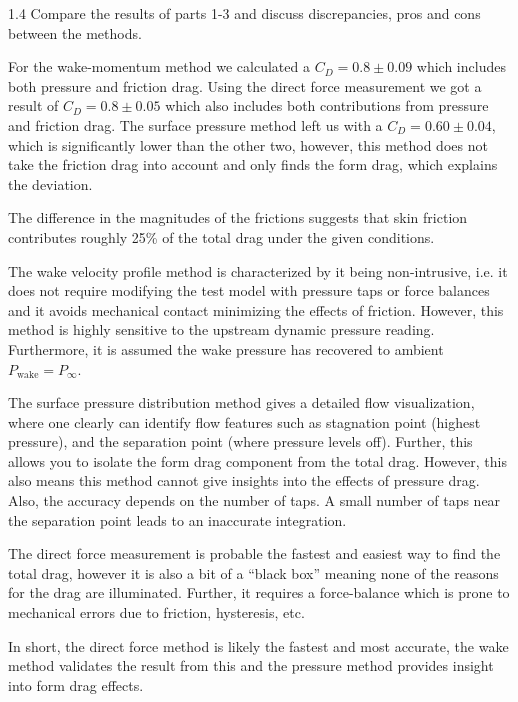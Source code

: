 
  \begin{problem}{1.4}
    Compare the results of parts 1-3 and discuss discrepancies, pros and cons between the methods.
  \end{problem}

  \begin{derivation}
    For the wake-momentum method we calculated a $C_D = \num{0,8}  \pm \num{0,09}$ which includes both pressure and friction drag.
    Using the direct force measurement we got a result of $C_D = \num{0,8} \pm \num{0,05}$ which also includes both contributions from pressure and friction drag.
    The surface pressure method left us with a $C_D = \num{0,60} \pm \num{0,04}$, which is significantly lower than the other two, however, this method does not take the friction drag into account and only finds the form drag, which explains the deviation.

    The difference in the magnitudes of the frictions suggests that skin friction contributes roughly 25\% of the total drag under the given conditions. 

    The wake velocity profile method is characterized by it being non-intrusive, i.e. it does not require modifying the test model with pressure taps or force balances and it avoids mechanical contact minimizing the effects of friction.
    However, this method is highly sensitive to the upstream dynamic pressure reading. Furthermore, it is assumed the wake pressure has recovered to ambient $P_{\text{wake}} = P_{\infty}$. 

    The surface pressure distribution method gives a detailed flow visualization, where one clearly can identify flow features such as stagnation point (highest pressure), and the separation point (where pressure levels off).
    Further, this allows you to isolate the form drag component from the total drag.
    However, this also means this method cannot give insights into the effects of pressure drag.
    Also, the accuracy depends on the number of taps.
    A small number of taps near the separation point leads to an inaccurate integration.

    The direct force measurement is probable the fastest and easiest way to find the total drag, however it is also a bit of a ``black box'' meaning none of the reasons for the drag are illuminated.
    Further, it requires a force-balance which is prone to mechanical errors due to friction, hysteresis, etc.

  In short, the direct force method is likely the fastest and most accurate, the wake method validates the result from this and the pressure method provides insight into form drag effects. 
  \end{derivation}

